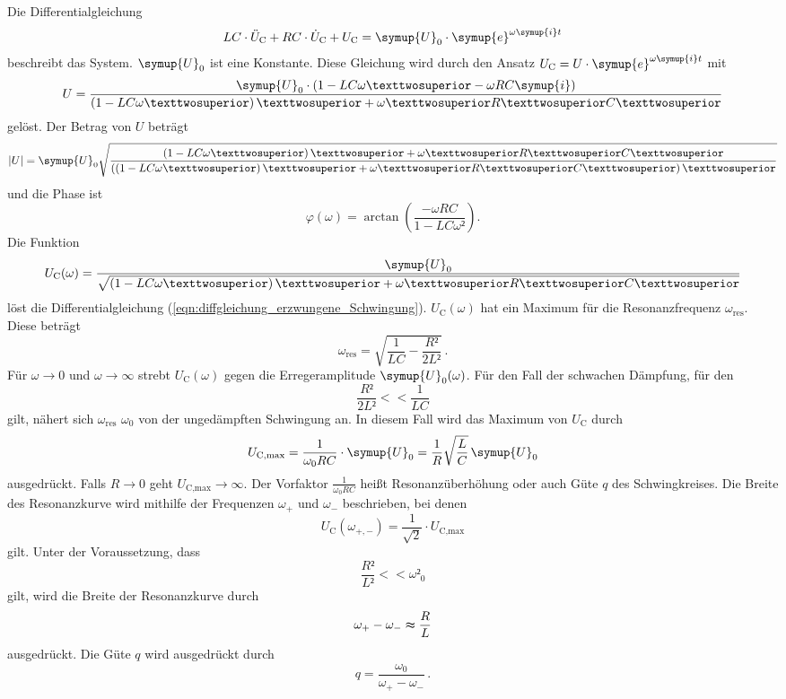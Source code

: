 Die Differentialgleichung 
\begin{equation}
    \label{eqn:diffgleichung_erzwungene_Schwingung}
    LC \cdot \ddot{U}_{\text{C}} + RC \cdot \dot{U}_{\text{C}} + U_{\text{C}} = \symup{U}_0 \cdot \symup{e}^{\omega \symup{i} t}
\end{equation}
beschreibt das System. $\symup{U}_0$ ist eine Konstante. Diese Gleichung wird durch den Ansatz $U_{\text{C}} = U \cdot \symup{e}^{\omega \symup{i}t}$ mit
\begin{equation}
    U = \frac{\symup{U}_0 \cdot \left(1 - LC \omega² - \omega R C \symup{i}\right)}{\left(1 - LC \omega²\right)² + \omega² R² C²}
\end{equation}
gelöst. Der Betrag von $U$ beträgt 
\begin{equation}
    |U| = \symup{U}_0 \sqrt{\frac{\left(1 - LC \omega²\right)² + \omega² R² C²}{\left(\left(1 - LC\omega²\right)² + \omega² R² C²\right)²}} 
\end{equation}
und die Phase ist
\begin{equation}
    \varphi (\omega) = \arctan{\left(\frac{- \omega R C}{1 - L C \omega²} \right)}. 
\end{equation}
Die Funktion 
\begin{equation}
    U_{\text{C}}(\omega) = \frac{\symup{U}_0}{\sqrt{\left(1 - LC \omega²\right)² + \omega² R² C²}}
    \label{eqn:Theoriekurve}
\end{equation}
löst die Differentialgleichung (\ref{eqn:diffgleichung_erzwungene_Schwingung}).
$U_{\text{C}}(\omega)$ hat ein Maximum für die Resonanzfrequenz $\omega_{\text{res}}$.
Diese beträgt
$$\omega_{\text{res}} = \sqrt{\frac{1}{LC} - \frac{R²}{2L²}}\, .$$
Für $\omega \rightarrow 0$ und $\omega \rightarrow \infty$ strebt $U_{\text{C}}(\omega)$
gegen die Erregeramplitude $\symup{U}_{\text{0}}(\omega)$.
Für den Fall der schwachen Dämpfung, für den 
$$\frac{R²}{2L²} << \frac{1}{LC}$$
gilt, nähert sich $\omega_{\text{res}}$ $\omega_0$ von der ungedämpften Schwingung an. 
In diesem Fall wird das Maximum von $U_{\text{C}}$ durch 
$$U_{\text{C,max}} =  \frac{1}{\omega_0 R C} \cdot \symup{U}_0 = \frac{1}{R}\sqrt{\frac{L}{C}} \, \symup{U}_0$$
ausgedrückt. 
Falls $R \rightarrow 0$ geht $U_{\text{C,max}} \rightarrow \infty$. Der Vorfaktor 
$\frac{1}{\omega_0 R C}$ heißt Resonanzüberhöhung oder auch Güte $q$ des Schwingkreises.
Die Breite des Resonanzkurve wird mithilfe der Frequenzen $\omega_+$ und $\omega_-$ beschrieben, 
bei denen 
$$U_{\text{C}}(\omega_{+,-}) = \frac{1}{\sqrt{2}} \cdot U_{\text{C,max}}$$
gilt. Unter der Voraussetzung, dass 
$$\frac{R²}{L²} << \omega²_0$$
gilt, wird die Breite der Resonanzkurve durch 
\begin{equation}
\omega_+ - \omega_- \thickapprox \frac{R}{L}
\label{eqn:BreiteResonanzkurve}
\end{equation}
ausgedrückt.
Die Güte $q$ wird ausgedrückt durch
\begin{equation}
    q = \frac{\omega_0}{\omega_+ - \omega_- } \, .
    \label{eqn:Güte}
\end{equation}